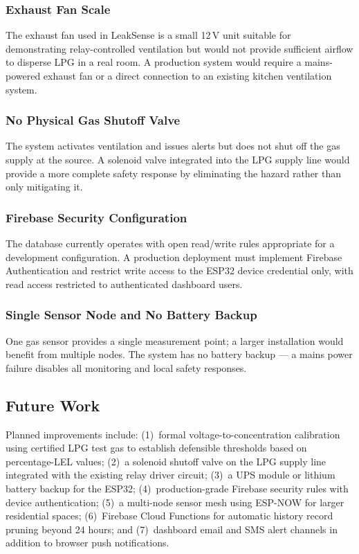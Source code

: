 \documentclass[a4paper,10pt,conference,onecolumn]{IEEEtran}
\begin{document}
\subsubsection{Exhaust Fan Scale}
The exhaust fan used in LeakSense is a small 12\,V unit suitable for
demonstrating relay-controlled ventilation but would not provide sufficient
airflow to disperse LPG in a real room. A production system would require a
mains-powered exhaust fan or a direct connection to an existing kitchen
ventilation system.

\subsubsection{No Physical Gas Shutoff Valve}
The system activates ventilation and issues alerts but does not shut off the
gas supply at the source. A solenoid valve integrated into the LPG supply
line would provide a more complete safety response by eliminating the hazard
rather than only mitigating it.

\subsubsection{Firebase Security Configuration}
The database currently operates with open read/write rules appropriate for a
development configuration. A production deployment must implement Firebase
Authentication and restrict write access to the ESP32 device credential only,
with read access restricted to authenticated dashboard users.

\subsubsection{Single Sensor Node and No Battery Backup}
One gas sensor provides a single measurement point; a larger installation
would benefit from multiple nodes. The system has no battery backup --- a
mains power failure disables all monitoring and local safety responses.

\subsection{Future Work}

Planned improvements include: (1)~formal voltage-to-concentration calibration
using certified LPG test gas to establish defensible thresholds based on
percentage-LEL values; (2)~a solenoid shutoff valve on the LPG supply line
integrated with the existing relay driver circuit; (3)~a UPS module or
lithium battery backup for the ESP32; (4)~production-grade Firebase security
rules with device authentication; (5)~a multi-node sensor mesh using ESP-NOW
for larger residential spaces; (6)~Firebase Cloud Functions for automatic
history record pruning beyond 24 hours; and (7)~dashboard email and SMS alert
channels in addition to browser push notifications.
\end{document}
